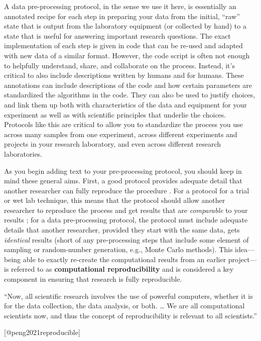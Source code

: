 \documentclass[]{tufte-book}
\begin{document}
A data pre-processing protocol, in the sense we use it here, is essentially an
annotated recipe for each step in preparing your data from the initial, ``raw''
state that is output from the laboratory equipment (or collected by hand) to a
state that is useful for answering important research questions. The exact
implementation of each step is given in code that can be re-used and adapted
with new data of a similar format. However, the code script is often not enough
to helpfully understand, share, and collaborate on the process. Instead, it's
critical to also include descriptions written by humans and for humans. These
annotations can include descriptions of the code and how certain parameters are
standardized the algorithms in the code. They can also be used to justify
choices, and link them up both with characteristics of the data and equipment
for your experiment as well as with scientific principles that underlie the
choices. Protocols like this are critical to allow you to standardize the
process you use across many samples from one experiment, across different
experiments and projects in your research laboratory, and even across different
research laboratories.

As you begin adding text to your pre-processing protocol, you should keep in
mind these general aims. First, a good protocol provides adequate detail that
another researcher can fully reproduce the procedure \citep{al2016protocol}. For a
protocol for a trial or wet lab technique, this means that the protocol should
allow another researcher to reproduce the process and get results that are
\emph{comparable} to your results \citep{al2016protocol}; for a data pre-processing
protocol, the protocol must include adequate details that another researcher,
provided they start with the same data, gets \emph{identical} results (short of any
pre-processing steps that include some element of sampling or random-number
generation, e.g., Monte Carlo methods). This idea---being able to exactly
re-create the computational results from an earlier project---is referred to as
\textbf{computational reproducibility} and is considered a key component in
ensuring that research is fully reproducible.

\begin{marginfigure}
``Now, all scientific research involves the use of powerful computers,
whether it is for the data collection, the data analysis, or both.
\ldots{} We are all computational scientists now, and thus the concept
of reproducibility is relevant to all scientists.''

{[}@peng2021reproducible{]}
\end{marginfigure}
\end{document}
